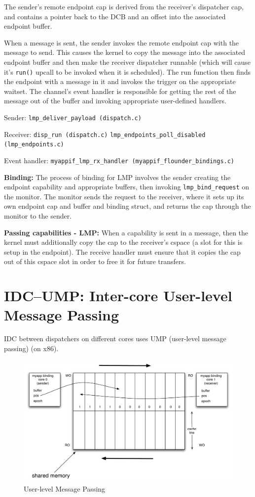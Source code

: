 \documentclass[a4paper,twoside]{report} %
\begin{document}
The sender's remote endpoint cap is derived from the receiver's dispatcher cap,
and contains a pointer back to the DCB and an offset into the associated
endpoint buffer.

When a message is sent, the sender invokes the remote endpoint cap with the
message to send. This causes the kernel to copy the message into the associated
endpoint buffer and then make the receiver dispatcher runnable (which will cause
it's \texttt{run()} upcall to be invoked when it is scheduled). The run function
then finds the endpoint with a message in it and invokes the trigger on the
appropriate waitset. The channel's event handler is responsible for getting the
rest of the message out of the buffer and invoking appropriate user-defined
handlers.

Sender: \texttt{lmp\_deliver\_payload (dispatch.c)}

Receiver: \texttt{disp\_run (dispatch.c)}
          \texttt{lmp\_endpoints\_poll\_disabled (lmp\_endpoints.c)}

Event handler: \texttt{myappif\_lmp\_rx\_handler (myappif\_flounder\_bindings.c)}

\textbf{Binding:} The process of binding for LMP involves the sender creating
the endpoint capability and appropriate buffers, then invoking
\texttt{lmp\_bind\_request} on the monitor. The monitor sends the request to the
receiver, where it sets up its own endpoint cap and buffer and binding struct,
and returns the cap through the monitor to the sender.

\textbf{Passing capabilities - LMP:} When a capability is sent in a message, then
the kernel must additionally copy the cap to the receiver's cspace (a slot for
this is setup in the endpoint). The receive handler must ensure that it copies
the cap out of this cspace slot in order to free it for future transfers.

\section{IDC\---UMP: Inter-core User-level Message Passing}

IDC between dispatchers on different cores uses UMP (user-level message passing)
(on x86).

\begin{figure}
  \begin{center}
    \includegraphics[width=0.5\columnwidth]{UMP.pdf}
  \end{center}
  \caption{User-level Message Passing}
  \label{fig:ump}
\end{figure}
\end{document}
